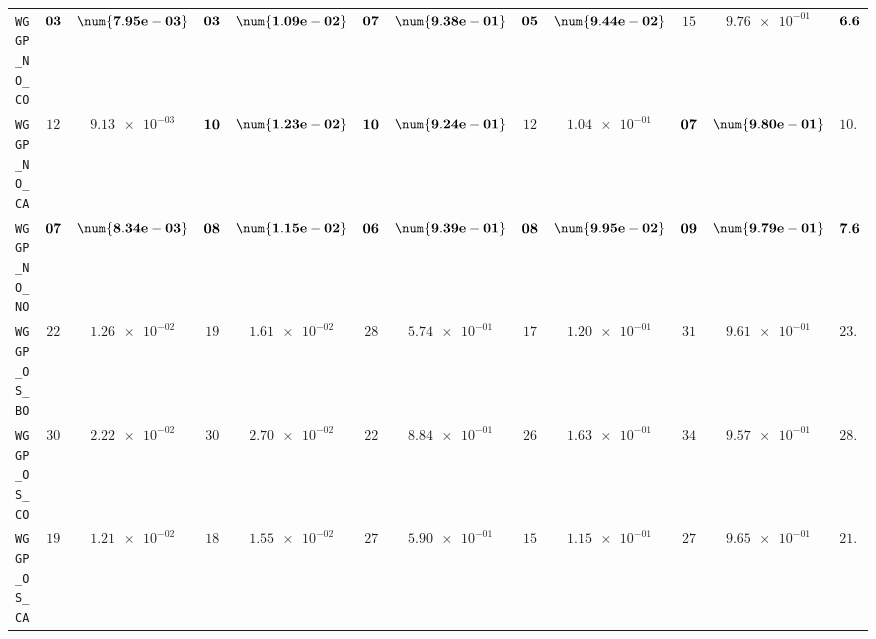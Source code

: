 \begin{table}[H]
\begin{tabularx}{\textwidth}{l||cC|cC|cC|cC|cC||c}
		\texttt{WGGP\_NO\_CO} & $\bf 03$ & $\bf \num{7.95e-03}$ & $\bf 03$ & $\bf \num{1.09e-02}$ & $\bf 07$ & $\bf \num{9.38e-01}$ & $\bf 05$ & $\bf \num{9.44e-02}$ & $ 15$ & $ \num{9.76e-01}$ & $\bf 6.6$  \\
		\texttt{WGGP\_NO\_CA} & $ 12$ & $ \num{9.13e-03}$ & $\bf 10$ & $\bf \num{1.23e-02}$ & $\bf 10$ & $\bf \num{9.24e-01}$ & $ 12$ & $ \num{1.04e-01}$ & $\bf 07$ & $\bf \num{9.80e-01}$ & $ 10.2$  \\
		\texttt{WGGP\_NO\_NO} & $\bf 07$ & $\bf \num{8.34e-03}$ & $\bf 08$ & $\bf \num{1.15e-02}$ & $\bf 06$ & $\bf \num{9.39e-01}$ & $\bf 08$ & $\bf \num{9.95e-02}$ & $\bf 09$ & $\bf \num{9.79e-01}$ & $\bf 7.6$  \\
		\texttt{WGGP\_OS\_BO} & $ 22$ & $ \num{1.26e-02}$ & $ 19$ & $ \num{1.61e-02}$ & $ 28$ & $ \num{5.74e-01}$ & $ 17$ & $ \num{1.20e-01}$ & $ 31$ & $ \num{9.61e-01}$ & $ 23.4$  \\
		\texttt{WGGP\_OS\_CO} & $ 30$ & $ \num{2.22e-02}$ & $ 30$ & $ \num{2.70e-02}$ & $ 22$ & $ \num{8.84e-01}$ & $ 26$ & $ \num{1.63e-01}$ & $ 34$ & $ \num{9.57e-01}$ & $ 28.4$  \\
		\texttt{WGGP\_OS\_CA} & $ 19$ & $ \num{1.21e-02}$ & $ 18$ & $ \num{1.55e-02}$ & $ 27$ & $ \num{5.90e-01}$ & $ 15$ & $ \num{1.15e-01}$ & $ 27$ & $ \num{9.65e-01}$ & $ 21.2$  \\

\end{tabularx}
\end{table}
